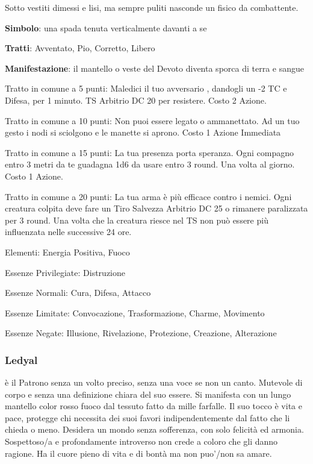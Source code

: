 \documentclass[a4paper,11pt,twoside,openany]{book}
\begin{document}
{Sotto vestiti dimessi e lisi, ma sempre puliti nasconde un fisico da combattente.

\textbf{Simbolo}: una spada tenuta verticalmente davanti a se

\textbf{Tratti}: Avventato, Pio, Corretto, Libero

\textbf{Manifestazione}: il mantello o veste del Devoto diventa sporca di terra e sangue

\bigskip

Tratto in comune a 5 punti: Maledici il tuo avversario , dandogli un -2 TC e Difesa, per 1 minuto. TS Arbitrio DC 20 per resistere. Costo 2 Azione.

Tratto in comune a 10 punti: Non puoi essere legato o ammanettato. Ad un tuo gesto i nodi si sciolgono e le manette si aprono. Costo 1 Azione Immediata

Tratto in comune a 15 punti: La tua presenza porta speranza. Ogni compagno entro 3 metri da te guadagna 1d6 da usare entro 3 round. Una volta al giorno. Costo 1 Azione.

Tratto in comune a 20 punti: La tua arma è più efficace contro i nemici. Ogni creatura colpita deve fare un Tiro Salvezza Arbitrio DC 25 o rimanere paralizzata per 3 round. Una volta che la creatura riesce nel TS non può essere più influenzata nelle successive 24 ore.

\bigskip

Elementi: Energia Positiva, Fuoco

\bigskip

Essenze Privilegiate: Distruzione

Essenze Normali: Cura, Difesa, Attacco

Essenze Limitate: Convocazione, Trasformazione, Charme, Movimento

Essenze Negate: Illusione, Rivelazione, Protezione, Creazione, Alterazione

\subsubsection{Ledyal}

\label{ledyal}

è il Patrono senza un volto preciso, senza una voce se non un canto. Mutevole di corpo e senza una definizione chiara del suo essere. Si manifesta con un lungo mantello color rosso fuoco dal tessuto fatto da mille farfalle. Il suo tocco è vita e pace, protegge chi necessita dei suoi favori indipendentemente dal fatto che li chieda o meno. Desidera un mondo senza sofferenza, con solo felicità ed armonia. Sospettoso/a e profondamente introverso non crede a coloro che gli danno ragione. Ha il cuore pieno di vita e di bontà ma non puo'/non sa amare.

}
\end{document}
